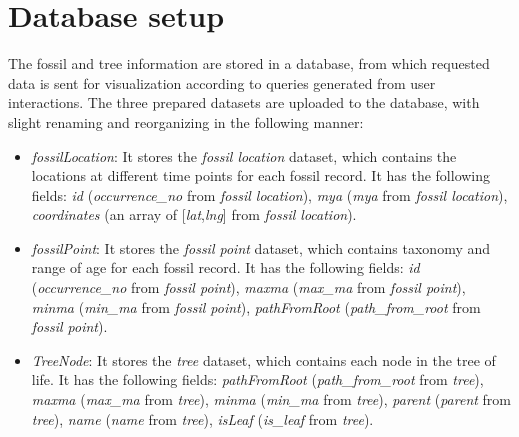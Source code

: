 \documentclass[11pt, a4paper,oneside,chapterprefix=false]{scrbook}
\begin{document}
\section{Database setup} \label{sec:tec_database_setup}
The fossil and tree information are stored in a database, from which requested data is sent for visualization according to queries generated from user interactions. The three prepared datasets are uploaded to the database, with slight renaming and reorganizing in the following manner:

\begin{itemize}
	\item \textit{fossilLocation}: It stores the \textit{fossil location} dataset, which contains the locations at different time points for each fossil record. It has the following fields: \textit{id} (\textit{occurrence\_no} from \textit{fossil location}), \textit{mya} (\textit{mya} from \textit{fossil location}), \textit{coordinates} (an array of [\textit{lat},\textit{lng}] from \textit{fossil location}).
	\item \textit{fossilPoint}: It stores the \textit{fossil point} dataset, which contains taxonomy and range of age for each fossil record. It has the following fields: \textit{id} (\textit{occurrence\_no} from \textit{fossil point}), \textit{maxma} (\textit{max\_ma} from \textit{fossil point}), \textit{minma} (\textit{min\_ma} from \textit{fossil point}), \textit{pathFromRoot} (\textit{path\_from\_root} from \textit{fossil point}).
	\item \textit{TreeNode}: It stores the \textit{tree} dataset, which contains each node in the tree of life. It has the following fields: \textit{pathFromRoot} (\textit{path\_from\_root} from \textit{tree}), \textit{maxma} (\textit{max\_ma} from \textit{tree}), \textit{minma} (\textit{min\_ma} from \textit{tree}), \textit{parent} (\textit{parent} from \textit{tree}), \textit{name} (\textit{name} from \textit{tree}), \textit{isLeaf} (\textit{is\_leaf} from \textit{tree}).
\end{itemize}
\end{document}
